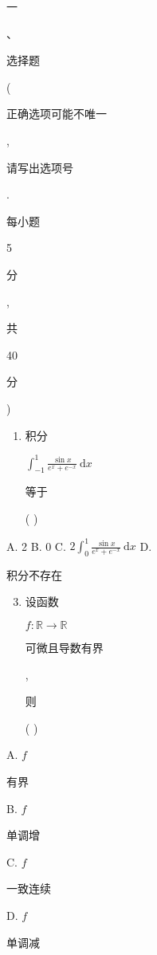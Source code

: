 \documentclass[10pt]{article}
\begin{document}
\begin{CJK}{UTF8}{mj}一\end{CJK}、\begin{CJK}{UTF8}{mj}选择题\end{CJK} (\begin{CJK}{UTF8}{mj}正确选项可能不唯一\end{CJK}, \begin{CJK}{UTF8}{mj}请写出选项号\end{CJK}. \begin{CJK}{UTF8}{mj}每小题\end{CJK} 5 \begin{CJK}{UTF8}{mj}分\end{CJK}, \begin{CJK}{UTF8}{mj}共\end{CJK} 40 \begin{CJK}{UTF8}{mj}分\end{CJK})

\begin{enumerate}
  \item \begin{CJK}{UTF8}{mj}积分\end{CJK} $\int_{-1}^{1} \frac{\sin x}{e^{x}+e^{-x}} \mathrm{~d} x$ \begin{CJK}{UTF8}{mj}等于\end{CJK} ( )
\end{enumerate}
A. 2 B. 0 C. $2 \int_{0}^{1} \frac{\sin x}{e^{x}+e^{-x}} \mathrm{~d} x$ D. \begin{CJK}{UTF8}{mj}积分不存在\end{CJK}

\begin{enumerate}
  \setcounter{enumi}{2}
  \item \begin{CJK}{UTF8}{mj}设函数\end{CJK} $f: \mathbb{R} \rightarrow \mathbb{R}$ \begin{CJK}{UTF8}{mj}可微且导数有界\end{CJK}, \begin{CJK}{UTF8}{mj}则\end{CJK} ( )
\end{enumerate}
A. $f$ \begin{CJK}{UTF8}{mj}有界\end{CJK} B. $f$ \begin{CJK}{UTF8}{mj}单调增\end{CJK} C. $f$ \begin{CJK}{UTF8}{mj}一致连续\end{CJK} D. $f$ \begin{CJK}{UTF8}{mj}单调减\end{CJK}
\end{document}
